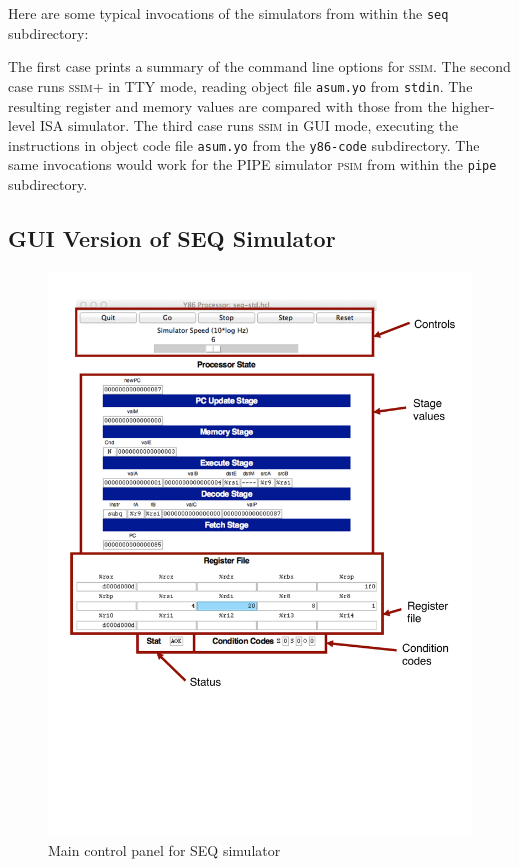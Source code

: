 \documentclass[11pt]{article}
\begin{document}
Here are some typical invocations of the simulators from within the \texttt{seq} subdirectory:
\begin{tty}
\end{tty}
The first case prints a summary of the command line options for
\textsc{ssim}.  The second case runs \textsc{ssim+} in TTY mode,
reading object file \texttt{asum.yo} from \texttt{stdin}.  The resulting register and memory values
are compared with those from the higher-level ISA simulator.
The third case runs
\textsc{ssim} in GUI mode, executing the instructions in object code file 
\texttt{asum.yo} from the \texttt{y86-code} subdirectory.  The same invocations
would work for the PIPE simulator \textsc{psim} from within the \texttt{pipe} subdirectory.

\subsection{GUI Version of SEQ Simulator}

\begin{figure}
\centerline{\includegraphics*[scale=1.0]{seq-cntl}}
\caption{Main control panel for SEQ simulator}
\label{fig:sim:seq-cntl}
\end{figure}
\end{document}
